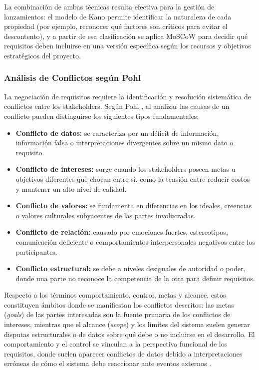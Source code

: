 \documentclass[journal,onecolumn]{IEEEtran}
\begin{document}
La combinación de ambas técnicas resulta efectiva para la gestión de
lanzamientos: el modelo de Kano permite identificar la naturaleza de cada
propiedad (por ejemplo, reconocer qué factores son críticos para evitar el
descontento), y a partir de esa clasificación se aplica MoSCoW para decidir
qué requisitos deben incluirse en una versión específica según los recursos
y objetivos estratégicos del proyecto.

\subsubsection{Análisis de Conflictos según Pohl}

La negociación de requisitos requiere la identificación y resolución
sistemática de conflictos entre los stakeholders. Según Pohl
\cite{pohl2025}, al analizar las causas de un conflicto pueden distinguirse
los siguientes tipos fundamentales:

\begin{itemize}[leftmargin=*]
  \item \textbf{Conflicto de datos:} se caracteriza por un déficit de
  información, información falsa o interpretaciones divergentes sobre un
  mismo dato o requisito.
  \item \textbf{Conflicto de intereses:} surge cuando los stakeholders
  poseen metas u objetivos diferentes que chocan entre sí, como la tensión
  entre reducir costos y mantener un alto nivel de calidad.
  \item \textbf{Conflicto de valores:} se fundamenta en diferencias en los
  ideales, creencias o valores culturales subyacentes de las partes
  involucradas.
  \item \textbf{Conflicto de relación:} causado por emociones fuertes,
  estereotipos, comunicación deficiente o comportamientos interpersonales
  negativos entre los participantes.
  \item \textbf{Conflicto estructural:} se debe a niveles desiguales de
  autoridad o poder, donde una parte no reconoce la competencia de la otra
  para definir requisitos.
\end{itemize}

Respecto a los términos comportamiento, control, metas y alcance, estos
constituyen ámbitos donde se manifiestan los conflictos descritos: las
metas (\textit{goals}) de las partes interesadas son la fuente primaria de
los conflictos de intereses, mientras que el alcance (\textit{scope}) y los
límites del sistema suelen generar disputas estructurales o de datos sobre
qué debe o no incluirse en el desarrollo. El comportamiento y el control se
vinculan a la perspectiva funcional de los requisitos, donde suelen
aparecer conflictos de datos debido a interpretaciones erróneas de cómo el
sistema debe reaccionar ante eventos externos \cite{pohl2025}.
\end{document}

